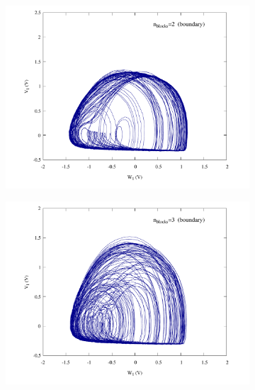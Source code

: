 \begin{figure}
    \centering
    \begin{minipage}{.47\textwidth}
        \begin{subfigure}{\linewidth}
            \centering
            \includegraphics[width=\linewidth]
            {../blocks/2_blocks/attractor.pdf}
        \end{subfigure}
    \end{minipage}
    \begin{minipage}{.47\textwidth}
        \begin{subfigure}{\linewidth}
            \centering
            \includegraphics[width=\linewidth]
            {../blocks/3_blocks/edge/attractor.pdf}

\end{subfigure}
\end{minipage}
\end{figure}
